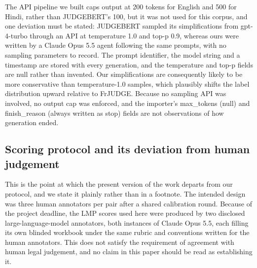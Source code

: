 \documentclass[conference]{IEEEtran}
\begin{document}
The API pipeline we built caps output at 200 tokens for English and 500 for Hindi, rather than JUDGEBERT's 100, but it was not used for this corpus, and one deviation must be stated: JUDGEBERT sampled its simplifications from gpt-4-turbo through an API at temperature 1.0 and top-p 0.9, whereas ours were written by a Claude Opus 5.5 agent following the same prompts, with no sampling parameters to record. The prompt identifier, the model string and a timestamp are stored with every generation, and the temperature and top-p fields are null rather than invented. Our simplifications are consequently likely to be more conservative than temperature-1.0 samples, which plausibly shifts the label distribution upward relative to FrJUDGE. Because no sampling API was involved, no output cap was enforced, and the importer's max\_tokens (null) and finish\_reason (always written as stop) fields are not observations of how generation ended.

\subsection{Scoring protocol and its deviation from human judgement}

This is the point at which the present version of the work departs from our protocol, and we state it plainly rather than in a footnote. The intended design was three human annotators per pair after a shared calibration round. Because of the project deadline, the LMP scores used here were produced by two disclosed large-language-model annotators, both instances of Claude Opus 5.5, each filling its own blinded workbook under the same rubric and conventions written for the human annotators. This does not satisfy the requirement of agreement with human legal judgement, and no claim in this paper should be read as establishing it.
\end{document}
